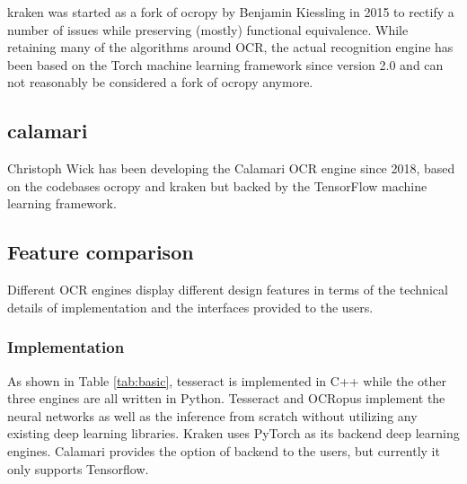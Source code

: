 \documentclass[conference]{IEEEtran}
\begin{document}
kraken \cite{DBLP:journals/corr/RomanovMSK17} was started as a fork of ocropy
by Benjamin Kiessling in 2015 to rectify a number of issues while preserving
(mostly) functional equivalence. While retaining many of the algorithms around
OCR, the actual recognition engine has been based on the Torch machine learning
framework since version 2.0 and can not reasonably be considered a fork of
ocropy anymore.


\subsection*{calamari}

Christoph Wick has been developing the Calamari
\cite{DBLP:journals/corr/abs-1807-02004} OCR engine since 2018, based on the
codebases ocropy and kraken but backed by the TensorFlow machine learning
framework.

\subsection*{Feature comparison}


Different OCR engines display different design features in terms of the
technical details of implementation and the interfaces provided to the users. 

\subsubsection*{Implementation}

As shown in Table \ref{tab:basic}, tesseract is implemented in C++ while the  
other three engines are all written in Python. Tesseract and OCRopus   
implement the neural networks as well as the inference from scratch without 
utilizing any existing deep learning libraries. Kraken uses PyTorch as its   
backend deep learning engines. Calamari provides the option of backend to the
users, but currently it only supports Tensorflow.                            

\end{document}
